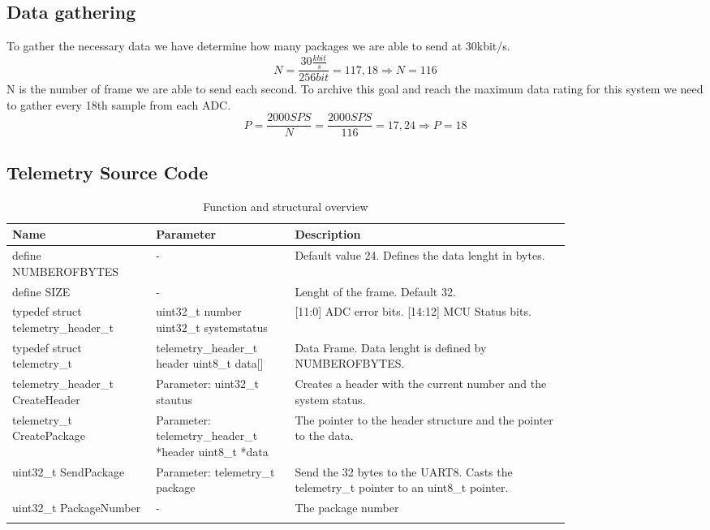 \subsection{Data gathering}
To gather the necessary data we have determine how many packages we are able to send at 30kbit/s. 
$$ N = \frac{30 \frac{kbit}{s}}{256 bit} = 117,18 \Rightarrow N = 116$$ 
N is the number of frame we are able to send each second. To archive this goal and reach the maximum data rating for this system we need to gather every 18th sample from each ADC. 
$$P = \frac{2000 SPS}{N} = \frac{2000 SPS}{116} = 17,24 \Rightarrow P = 18 $$
\subsection{Telemetry Source Code}
\begin{longtable}{|m{0.2\linewidth}|m{0.2\linewidth}|m{0.4\linewidth}|}
	\hline
	\textbf{Name} & \textbf{Parameter} & \textbf{Description}\\	\hline
	define NUMBEROFBYTES & - & Default value 24. Defines the data lenght in bytes. \\ \hline
	define SIZE & - & Lenght of the frame. Default 32. \\ \hline 
	typedef struct telemetry\_header\_t & uint32\_t number  uint32\_t systemstatus & [11:0] ADC error bits. [14:12] MCU Status bits. \\ \hline 
	typedef struct telemetry\_t & telemetry\_header\_t header uint8\_t data[] & Data Frame. Data lenght is defined by NUMBEROFBYTES.\\ \hline 
	telemetry\_header\_t CreateHeader & Parameter: uint32\_t stautus & Creates a header with the current number and the system status. \\ \hline 
	telemetry\_t CreatePackage & Parameter: telemetry\_header\_t *header uint8\_t *data & The pointer to the header structure and the pointer to the data. \\ \hline 
	uint32\_t SendPackage & Parameter: telemetry\_t package & Send the 32 bytes to the UART8. Casts the telemetry\_t pointer to an uint8\_t pointer. \\ \hline 
	uint32\_t PackageNumber & - & The package number \\ \hline 
	\caption{Function and structural overview}
	\label{tab:functions}
\end{longtable}